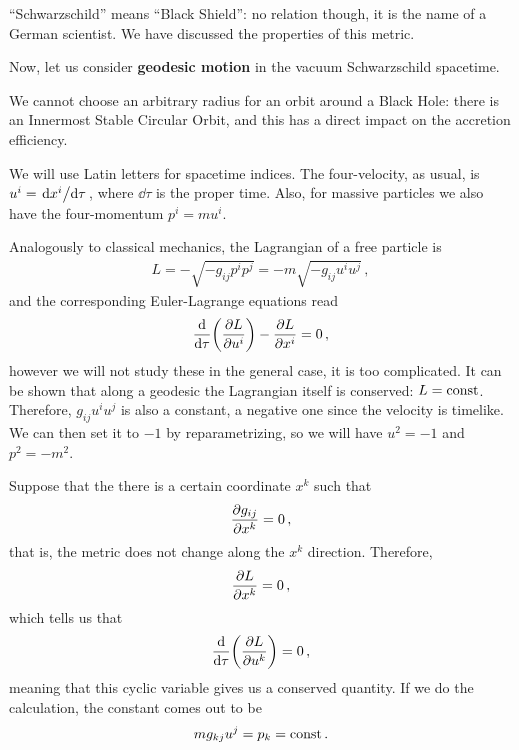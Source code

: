 \documentclass[main.tex]{subfiles}
\begin{document}


``Schwarzschild'' means ``Black Shield'': no relation though, it is the name of a German scientist. 
We have discussed the properties of this metric. 

Now, let us consider \textbf{geodesic motion} in the vacuum Schwarzschild spacetime. 

We cannot choose an arbitrary radius for an orbit around a Black Hole: there is an Innermost Stable Circular Orbit, and this has a direct impact on the accretion efficiency. 

We will use Latin letters for spacetime indices.
The four-velocity, as usual, is \(u^{i} = \dv*{x^{i}}{\tau }\), where \(\dd{\tau }\) is the proper time. 
Also, for massive particles we also have the four-momentum \(p^{i} = m u^{i}\). 

Analogously to classical mechanics, the Lagrangian of a free particle is 
%
\begin{align}
L =- \sqrt{- g_{ij} p^{i} p^{j}} = -m \sqrt{- g_{ij} u^{i} u^{j}}
\,,
\end{align}
%
and the corresponding Euler-Lagrange equations read 
%
\begin{align}
\dv{}{\tau } \qty(\pdv{L}{u^{i}}) - \pdv{L}{x^{i}} = 0
\,,
\end{align}
%
however we will not study these in the general case, it is too complicated. 
It can be shown that along a geodesic the Lagrangian itself is conserved: \(L = \text{const}\). 
Therefore, \(g_{ij} u^{i} u^{j}\) is also a constant, a negative one since the velocity is timelike. We can then set it to \(-1\) by reparametrizing, so we will have \(u^2 = -1\) and \(p^2= -m^2\). 

Suppose that the there is a certain coordinate \(x^{k}\) such that 
%
\begin{align}
\pdv{g_{ij}}{x^{k}} = 0
\,,
\end{align}
%
that is, the metric does not change along the \(x^{k}\) direction. 
Therefore, 
%
\begin{align}
\pdv{L}{x^{k}} =0
\,,
\end{align}
%
which tells us that 
%
\begin{align}
\dv{}{\tau } \qty(\pdv{L}{ u^{k}}) = 0
\,,
\end{align}
%
meaning that this cyclic variable gives us a conserved quantity. If we do the calculation, the constant comes out to be
%
\begin{align}
m g_{kj} u^{j} = p_k =  \text{const}
\,.
\end{align}
\end{document}
